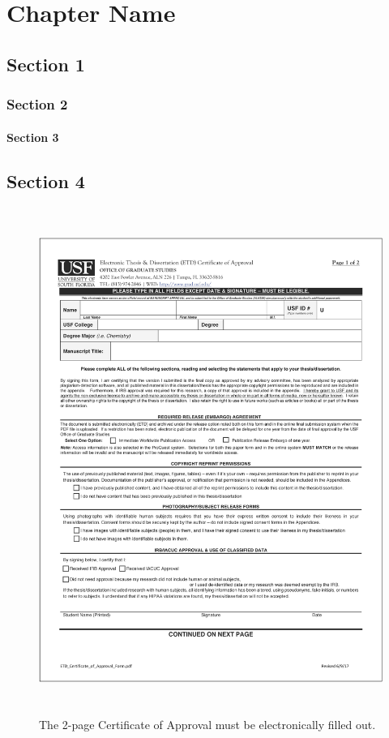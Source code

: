 

\chapter{Chapter Name}
\label{chap:ch2}


\section{Section 1}
\label{sec:ch2:section1}

\blindtext

\subsection{Section 2}

\blinditemize

\subsubsection{Section 3}
\blindenumerate[3]

\section{Section 4}

\begin{figure}[htp]
    \includegraphics[height=16.5cm]{Figures/Picture1.png}
    \caption{The 2-page Certificate of Approval must be electronically filled out.  }
    \label{fig:my_label}
\end{figure}

